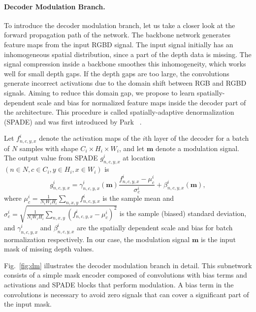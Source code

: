 \documentclass[final]{cvpr}
\begin{document}
    \paragraph{Decoder Modulation Branch.}\label{par:decoder_modulation_branch}
    To introduce the decoder modulation branch, let us take a closer look at the forward propagation path of the network. The backbone network generates feature maps from the input RGBD signal. The input signal initially has an inhomogeneous spatial distribution, since a part of the depth data is missing. The signal compression inside a backbone smoothes this inhomogeneity, which works well for small depth gaps. If the depth gaps are too large, the convolutions generate incorrect activations due to the domain shift between RGB and RGBD signals. Aiming to reduce this domain gap, we propose to learn spatially-dependent scale and bias for normalized feature maps inside the decoder part of the architecture. This procedure is called spatially-adaptive denormalization (SPADE) and was first introduced by Park \etal~\cite{spade}.
    
    Let $f^i_{n,c,y,x}$ denote the activation maps of the $i$th layer of the decoder for a batch of $N$ samples with shape $C_i \times H_i \times W_i$, and let $\textbf{m}$ denote a modulation signal. The output value from SPADE $g^i_{n,c,y,x}$ at location $(n \in N, c \in C_i, y \in H_i, x \in W_i)$ is
$$
        g^i_{n,c,y,x} =  \gamma^i_{n,c,y,x}(\textbf{m}) \frac{f^i_{n,c,y,x} - \mu^i_c}{\sigma^i_c} + \beta^i_{n,c,y,x}(\textbf{m}),
$$
    where $\mu^i_c = \frac{1}{N_iW_iH_i} \sum_{n,x,y} f^i_{n,c,y,x}$ is the sample mean and $\sigma^i_c= \sqrt{\frac{1}{N_iW_iH_i} \sum_{n,x,y}(f^i_{n,c,y,x} - \mu^i_c)^2 }$ is the sample (biased) standard deviation, and $\gamma^i_{n,c,y,x}$ and $\beta^i_{n,c,y,x}$ are the spatially dependent scale and bias for batch normalization respectively. In our case, the modulation signal $\textbf{m}$ is the input mask of missing depth values. 
    
    Fig.~\ref{fig:dm} illustrates the decoder modulation branch in detail. This subnetwork consists of a simple mask encoder composed of convolutions with bias terms and activations and SPADE blocks that perform modulation. A bias term in the convolutions is necessary to avoid zero signals that can cover a significant part of the input mask.
    
\end{document}

